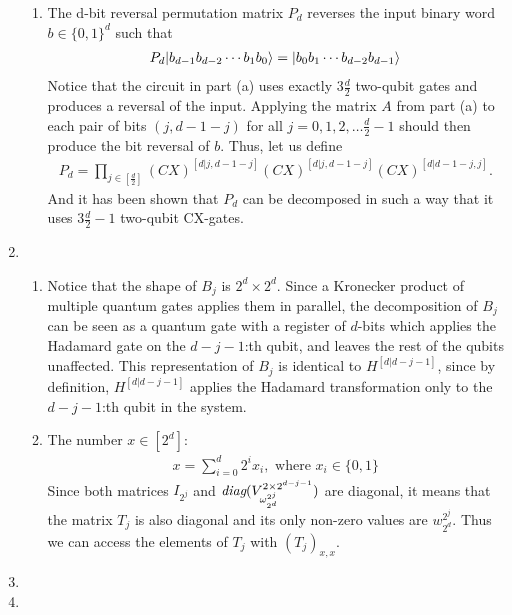 \documentclass[11pt,a4paper]{article}
\begin{document}
\begin{enumerate}
\begin{enumerate}
              \item The d-bit reversal permutation matrix $P_d$ reverses the input binary word $b \in \{0, 1\}^d$ such that
                    \begin{align*}
                        P_d|b_{d - 1}b_{d-2} \cdots b_1 b_0\rangle = |b_0 b_1 \cdots b_{d - 2} b_{d - 1}\rangle
                    \end{align*}
                    Notice that the circuit in part (a) uses exactly $3 \frac{d}{2}$ two-qubit gates and produces
                    a reversal of the input. Applying the matrix $A$ from part (a) to each pair of bits $(j, d - 1 - j)$ for all
                    $j = 0, 1, 2, \dots \frac{d}{2} - 1$ should then produce the bit reversal of $b$. Thus, let us define
                    \begin{align*}
                        P_d = \prod_{j \in [\frac{d}{2}]} (CX)^{[d|j, d - 1 - j]} (CX)^{[d|j, d - 1 - j]} (CX)^{[d| d - 1 - j, j]}.
                    \end{align*}
                    And it has been shown that $P_d$ can be decomposed in such a way that it uses $3 \frac{d}{2} - 1$ two-qubit CX-gates.
          \end{enumerate}

          \newpage

    \item \begin{enumerate}

              \item Notice that the shape of $B_j$ is $2^d \times 2^d$. Since a Kronecker product of multiple quantum gates
                    applies them in parallel, the decomposition of $B_j$ can be seen as a quantum gate with a register of $d$-bits which applies the
                    Hadamard gate on the $d - j - 1$:th qubit, and leaves the rest of the qubits unaffected. This
                    representation of $B_j$ is identical to $H^{[d|d-j-1]}$, since by definition, $H^{[d|d-j-1]}$ applies the Hadamard
                    transformation only to the $d-j-1$:th qubit in the system.

              \item The number  $x \in [2^d]$:
                    \begin{align*}
                        x = \sum_{i = 0}^{d} 2^i x_{i},  \text{ where } x_i \in \{0,1\}
                    \end{align*}
                    Since both matrices $I_{2^j}$ and $\textit{diag}{(V_{\omega^{2^j}_{2^d}}^{2 \times 2^{d-j-1}})}$ are diagonal, it means that
                    the matrix $T_j$ is also diagonal and its only non-zero values are $w_{2^d}^{2^j}$.
                    Thus we can access the elements of $T_j$ with $(T_j)_{x, x}$.
          \end{enumerate}

          \newpage

    \item

          \newpage

    \item

          \newpage
\end{enumerate}
\end{document}
